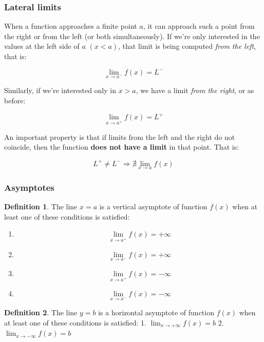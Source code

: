 \documentclass[a4paper,11pt]{article}
\theoremstyle{definition}
\newtheorem{definition}{Definition}
\theoremstyle{plain}
\begin{document}
\subsubsection{Lateral limits}\label{lateral-limits}

When a function approaches a finite point \(a\), it can approach such a
point from the right or from the left (or both simultaneously). If we're
only interested in the values at the left side of \(a\) \((x < a)\),
that limit is being computed \emph{from the left}, that is:

\[
\lim_{x\rightarrow a^{-}}f(x) = L^{-}
\]

Similarly, if we're interested only in \(x > a\), we have a limit
\emph{from the right}, or as before:

\[
\lim_{x\rightarrow a^{+}}f(x) = L^{+}
\]

An important property is that if limits from the left and the right do
not coincide, then the function \textbf{does not have a limit} in that
point. That is:

\[
L^+ \neq L^- \Rightarrow \nexists\lim_{x\rightarrow a} f(x)
\]

\subsubsection{Asymptotes}\label{asymptotes}

\begin{definition}
The line \(x = a\) is a vertical asymptote of function \(f(x)\) when at
least one of these conditions is satisfied:

\begin{enumerate}
    \item \[
    \lim_{x\rightarrow a^+}f(x) = +\infty
    \]
    \item \[
    \lim_{x\rightarrow a^-}f(x) = +\infty
    \]
    \item \[
    \lim_{x\rightarrow a^+}f(x) = -\infty
    \]
    \item \[
    \lim_{x\rightarrow a^-}f(x) = -\infty
    \]
\end{enumerate}
\end{definition}

\begin{definition}
The line \(y = b\) is a horizontal asymptote of function \(f(x)\) when
at least one of these conditions is satisfied: 1.
\(\lim_{x\rightarrow +\infty} f(x) = b\) 2.
\(\lim_{x\rightarrow -\infty} f(x) = b\)
\end{definition}
\end{document}
